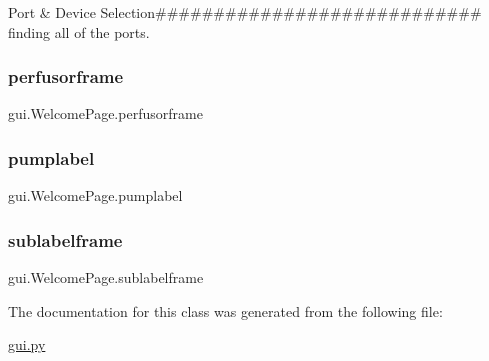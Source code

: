 Port \& Device Selection\#\#\#\#\#\#\#\#\#\#\#\#\#\#\#\#\#\#\#\#\#\#\#\#\#\#\#\# finding all of the ports. 

\mbox{\label{classgui_1_1_welcome_page_acf22ea45b4f78ec45bcf83f9c3d32c01}} 
\subsubsection{\texorpdfstring{perfusorframe}{perfusorframe}}
{\footnotesize\ttfamily gui.\+Welcome\+Page.\+perfusorframe}

\mbox{\label{classgui_1_1_welcome_page_a750ef6fb7d0bd37635b2dd711b187067}} 
\subsubsection{\texorpdfstring{pumplabel}{pumplabel}}
{\footnotesize\ttfamily gui.\+Welcome\+Page.\+pumplabel}

\mbox{\label{classgui_1_1_welcome_page_a80e84cfdf7527c98d14573a143b6f0fd}} 
\subsubsection{\texorpdfstring{sublabelframe}{sublabelframe}}
{\footnotesize\ttfamily gui.\+Welcome\+Page.\+sublabelframe}



The documentation for this class was generated from the following file\+:\begin{DoxyCompactItemize}
\item 
\mbox{\hyperlink{gui_8py}{gui.\+py}}\end{DoxyCompactItemize}
